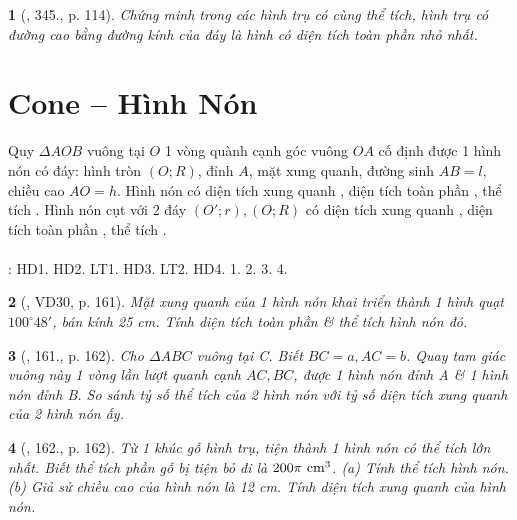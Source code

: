 \documentclass{article}
\newtheorem{baitoan}{}
\begin{document}
\begin{baitoan}[\cite{Binh_Toan_9_tap_2}, 345., p. 114]
	Chứng minh trong các hình trụ có cùng thể tích, hình trụ có đường cao bằng đường kính của đáy là hình có diện tích toàn phần nhỏ nhất.
\end{baitoan}


\section{Cone -- Hình Nón}
 Quy $\Delta AOB$ vuông tại $O$ 1 vòng quành cạnh góc vuông $OA$ cố định được 1 hình nón có đáy: hình tròn $(O;R)$, đỉnh $A$, mặt xung quanh, đường sinh $AB = l$, chiều cao $AO = h$.  Hình nón có diện tích xung quanh , diện tích toàn phần , thể tích .  Hình nón cụt với 2 đáy $(O';r),(O;R)$ có diện tích xung quanh , diện tích toàn phần , thể tích .\\
\\
\cite[Chap. X, \S2, pp. 98--103]{SGK_Toan_9_Canh_Dieu_tap_1}: HD1. HD2. LT1. HD3. LT2. HD4. 1. 2. 3. 4.

\begin{baitoan}[\cite{Tuyen_Toan_9_old}, VD30, p. 161]
	Mặt xung quanh của 1 hình nón khai triển thành 1 hình quạt $100^\circ48'$, bán kính {\rm25 cm}. Tính diện tích toàn phần \& thể tích hình nón đó.
\end{baitoan}

\begin{baitoan}[\cite{Tuyen_Toan_9_old}, 161., p. 162]
	Cho $\Delta ABC$ vuông tại C. Biết $BC = a,AC = b$. Quay tam giác vuông này 1 vòng lần lượt quanh cạnh $AC,BC$, được 1 hình nón đỉnh A \& 1 hình nón đỉnh B. So sánh tỷ số thể tích của 2 hình nón với tỷ số diện tích xung quanh của 2 hình nón ấy.
\end{baitoan}

\begin{baitoan}[\cite{Tuyen_Toan_9_old}, 162., p. 162]
	Từ 1 khúc gỗ hình trụ, tiện thành 1 hình nón có thể tích lớn nhất. Biết thể tích phần gỗ bị tiện bỏ đi là $200\pi\ {\rm cm}^3$. (a) Tính thể tích hình nón. (b) Giả sử chiều cao của hình nón là {\rm12 cm}. Tính diện tích xung quanh của hình nón.
\end{baitoan}
\end{document}
